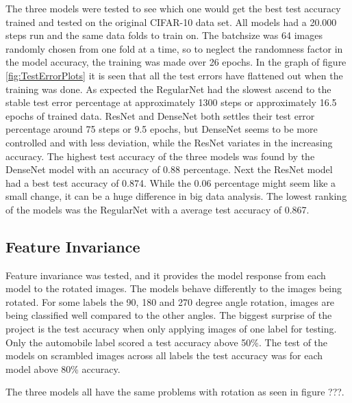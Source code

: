 The three models were tested to see which one would get the best test accuracy trained and tested on the original CIFAR-10 data set. All models had a 20.000 steps run and the same data folds to train on. The batchsize was 64 images randomly chosen from one fold at a time, so to neglect the randomness factor in the model accuracy, the training was made over 26 epochs. In the graph of figure \ref{fig:TestErrorPlots} it is seen that all the test errors have flattened out when the training was done. As expected the RegularNet had the slowest ascend to the stable test error percentage at approximately 1300 steps or approximately 16.5 epochs of trained data. ResNet and DenseNet both settles their test error percentage around 75 steps or 9.5 epochs, but DenseNet seems to be more controlled and with less deviation, while the ResNet variates in the increasing accuracy. The highest test accuracy of the three models was found by the DenseNet model with an accuracy of 0.88 percentage. Next the ResNet model had a best test accuracy of 0.874. While the 0.06 percentage might seem like a small change, it can be a huge difference in big data analysis. The lowest ranking of the models was the RegularNet with a average test accuracy of 0.867.

\subsection{Feature Invariance}

Feature invariance was tested, and it provides the model response from each model to the rotated images. The models behave differently to the images being rotated. For some labels the 90, 180 and 270 degree angle rotation, images are being classified well compared to the other angles. The biggest surprise of the project is the test accuracy when only applying images of one label for testing. Only the automobile label scored a test accuracy above 50\%. The test of the models on scrambled images across all labels the test accuracy was for each model above 80\% accuracy.

The three models all have the same problems with rotation as seen in figure ???.

\FloatBarrier


